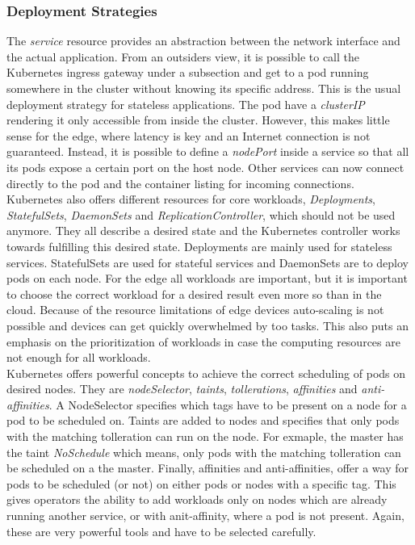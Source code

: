 \subsubsection{Deployment Strategies}
The \textit{service} resource provides an abstraction between the network interface and the actual application. From an outsiders view, it is possible to call the Kubernetes ingress gateway under a subsection and get to a pod running somewhere in the cluster without knowing its specific address. This is the usual deployment strategy for stateless applications. The pod have a \textit{clusterIP} rendering it only accessible from inside the cluster. However, this makes little sense for the edge, where latency is key and an Internet connection is not guaranteed. Instead, it is possible to define a \textit{nodePort} inside a service so that all its pods expose a certain port on the host node. Other services can now connect directly to the pod and the container listing for incoming connections.\\
Kubernetes also offers different resources for core workloads, \textit{Deployments},  \textit{StatefulSets},  \textit{DaemonSets} and  \textit{ReplicationController}, which should not be used anymore\cite{CoreWorkloadKubernetes66:online}. They all describe a desired state and the Kubernetes controller works towards fulfilling this desired state. Deployments are mainly used for stateless services. StatefulSets are used for stateful services and DaemonSets are to deploy pods on each node. For the edge all workloads are important, but it is important to choose the correct workload for a desired result even more so than in the cloud. Because of the resource limitations of edge devices auto-scaling is not possible and devices can get quickly overwhelmed by too tasks. This also puts an emphasis on the prioritization of workloads in case the computing resources are not enough for all workloads.\\
Kubernetes offers powerful concepts to achieve the correct scheduling of pods on desired nodes. They are \textit{nodeSelector}, \textit{taints}, \textit{tollerations}, \textit{affinities} and \textit{anti-affinities}. A NodeSelector specifies which tags have to be present on a node for a pod to be scheduled on. Taints are added to nodes and specifies that only pods with the matching tolleration can run on the node. For exmaple, the master has the taint \textit{NoSchedule} which means, only pods with the matching tolleration can be scheduled on a the master. Finally, affinities and anti-affinities, offer a way for pods to be scheduled (or not) on either pods or nodes with a specific tag. This gives operators the ability to add workloads only on nodes which are already running another service, or with anit-affinity, where a pod is not present. Again, these are very powerful tools and have to be selected carefully.\\
